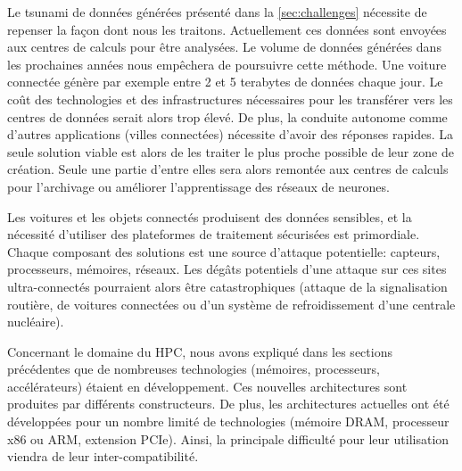         Le tsunami de données générées présenté dans la \autoref{sec:challenges} nécessite de repenser la façon dont nous les traitons. Actuellement ces données sont envoyées aux centres de calculs pour être analysées. Le volume de données générées dans les prochaines années nous empêchera de poursuivre cette méthode. Une voiture connectée génère par exemple entre 2 et 5 terabytes de données chaque jour. Le coût des technologies et des infrastructures nécessaires pour les transférer vers les centres de données serait alors trop élevé. De plus, la conduite autonome comme d'autres applications (villes connectées) nécessite d'avoir des réponses rapides. La seule solution viable est alors de les traiter le plus proche possible de leur zone de création. Seule une partie d'entre elles sera alors remontée aux centres de calculs pour l'archivage ou améliorer l'apprentissage des réseaux de neurones.
        
        Les voitures et les objets connectés produisent des données sensibles, et la nécessité d'utiliser des plateformes de traitement sécurisées est primordiale. Chaque composant des solutions est une source d’attaque potentielle: capteurs, processeurs, mémoires, réseaux. Les dégâts potentiels d'une attaque sur ces sites ultra-connectés pourraient alors être catastrophiques (attaque de la signalisation routière, de voitures connectées ou d'un système de refroidissement d'une centrale nucléaire).
    
        Concernant le domaine du HPC, nous avons expliqué dans les sections précédentes que de nombreuses technologies (mémoires, processeurs, accélérateurs) étaient en développement. Ces nouvelles architectures sont produites par différents constructeurs. De plus, les architectures actuelles ont été développées pour un nombre limité de technologies (mémoire DRAM, processeur x86 ou ARM, extension PCIe). Ainsi, la principale difficulté pour leur utilisation viendra de leur inter-compatibilité. 
        
       
                
